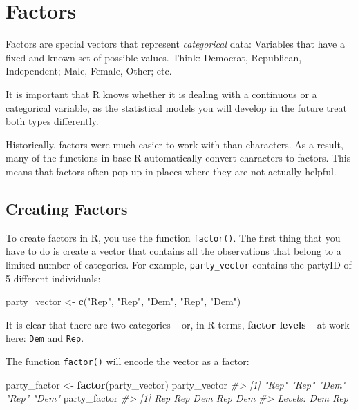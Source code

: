 \documentclass[
]{book}
\newenvironment{Shaded}{\begin{snugshade}}{\end{snugshade}}
\newcommand{\CommentTok}[1]{\textcolor[rgb]{0.56,0.35,0.01}{\textit{#1}}}
\newcommand{\KeywordTok}[1]{\textcolor[rgb]{0.13,0.29,0.53}{\textbf{#1}}}
\newcommand{\NormalTok}[1]{#1}
\newcommand{\StringTok}[1]{\textcolor[rgb]{0.31,0.60,0.02}{#1}}
\begin{document}
\hypertarget{factors}{%
\section{Factors}\label{factors}}

Factors are special vectors that represent \emph{categorical} data: Variables that have a fixed and known set of possible values. Think: Democrat, Republican, Independent; Male, Female, Other; etc.

It is important that R knows whether it is dealing with a continuous or a categorical variable, as the statistical models you will develop in the future treat both types differently.

Historically, factors were much easier to work with than characters. As a result, many of the functions in base R automatically convert characters to factors. This means that factors often pop up in places where they are not actually helpful.

\hypertarget{creating-factors}{%
\subsection{Creating Factors}\label{creating-factors}}

To create factors in R, you use the function \texttt{factor()}. The first thing that you have to do is create a vector that contains all the observations that belong to a limited number of categories. For example, \texttt{party\_vector} contains the partyID of 5 different individuals:

\begin{Shaded}
\begin{Highlighting}[]
\NormalTok{party_vector <-}\StringTok{ }\KeywordTok{c}\NormalTok{(}\StringTok{"Rep"}\NormalTok{, }\StringTok{"Rep"}\NormalTok{, }\StringTok{"Dem"}\NormalTok{, }\StringTok{"Rep"}\NormalTok{, }\StringTok{"Dem"}\NormalTok{)}
\end{Highlighting}
\end{Shaded}

It is clear that there are two categories -- or, in R-terms, \textbf{factor levels} -- at work here: \texttt{Dem} and \texttt{Rep}.

The function \texttt{factor()} will encode the vector as a factor:

\begin{Shaded}
\begin{Highlighting}[]
\NormalTok{party_factor <-}\StringTok{ }\KeywordTok{factor}\NormalTok{(party_vector)}
\NormalTok{party_vector}
\CommentTok{#> [1] "Rep" "Rep" "Dem" "Rep" "Dem"}
\NormalTok{party_factor}
\CommentTok{#> [1] Rep Rep Dem Rep Dem}
\CommentTok{#> Levels: Dem Rep}
\end{Highlighting}
\end{Shaded}
\end{document}
